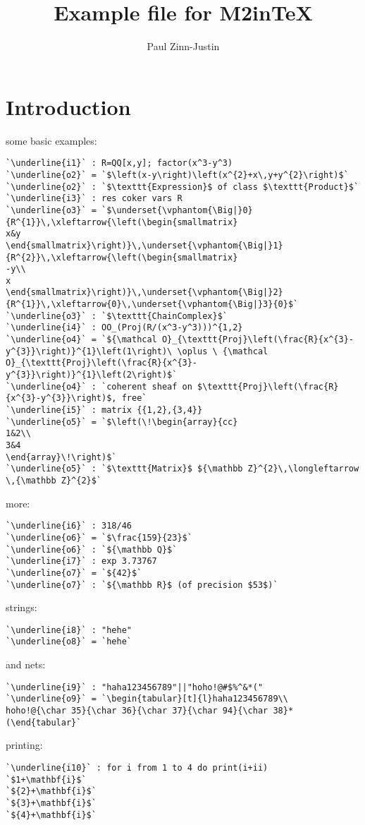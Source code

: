 \documentclass[12pt,a4paper]{amsart}
\title{Example file for M2inTeX}
\author{Paul Zinn-Justin}
\begin{document}
\maketitle

\section{Introduction}
some basic examples:
\begin{lstlisting}[language=Macaulay2]
`\underline{i1}` : R=QQ[x,y]; factor(x^3-y^3)
`\underline{o2}` = `$\left(x-y\right)\left(x^{2}+x\,y+y^{2}\right)$`
`\underline{o2}` : `$\texttt{Expression}$ of class $\texttt{Product}$`
`\underline{i3}` : res coker vars R
`\underline{o3}` = `$\underset{\vphantom{\Big|}0}{R^{1}}\,\xleftarrow{\left(\begin{smallmatrix}
x&y
\end{smallmatrix}\right)}\,\underset{\vphantom{\Big|}1}{R^{2}}\,\xleftarrow{\left(\begin{smallmatrix}
-y\\
x
\end{smallmatrix}\right)}\,\underset{\vphantom{\Big|}2}{R^{1}}\,\xleftarrow{0}\,\underset{\vphantom{\Big|}3}{0}$`
`\underline{o3}` : `$\texttt{ChainComplex}$`
`\underline{i4}` : OO_(Proj(R/(x^3-y^3)))^{1,2}
`\underline{o4}` = `${\mathcal O}_{\texttt{Proj}\left(\frac{R}{x^{3}-y^{3}}\right)}^{1}\left(1\right)\ \oplus \ {\mathcal O}_{\texttt{Proj}\left(\frac{R}{x^{3}-y^{3}}\right)}^{1}\left(2\right)$`
`\underline{o4}` : `coherent sheaf on $\texttt{Proj}\left(\frac{R}{x^{3}-y^{3}}\right)$, free`
`\underline{i5}` : matrix {{1,2},{3,4}}
`\underline{o5}` = `$\left(\!\begin{array}{cc}
1&2\\
3&4
\end{array}\!\right)$`
`\underline{o5}` : `$\texttt{Matrix}$ ${\mathbb Z}^{2}\,\longleftarrow \,{\mathbb Z}^{2}$`\end{lstlisting}
more:
\begin{lstlisting}[language=Macaulay2]
`\underline{i6}` : 318/46
`\underline{o6}` = `$\frac{159}{23}$`
`\underline{o6}` : `${\mathbb Q}$`
`\underline{i7}` : exp 3.73767
`\underline{o7}` = `${42}$`
`\underline{o7}` : `${\mathbb R}$ (of precision $53$)`\end{lstlisting}
strings:
\begin{lstlisting}[language=Macaulay2]
`\underline{i8}` : "hehe"
`\underline{o8}` = `hehe`\end{lstlisting}
and nets:
\begin{lstlisting}[language=Macaulay2]
`\underline{i9}` : "haha123456789"||"hoho!@#$%^&*("
`\underline{o9}` = `\begin{tabular}[t]{l}haha123456789\\
hoho!@{\char 35}{\char 36}{\char 37}{\char 94}{\char 38}*(\end{tabular}`\end{lstlisting}
printing:
\begin{lstlisting}[language=Macaulay2]
`\underline{i10}` : for i from 1 to 4 do print(i+ii)
`$1+\mathbf{i}$`
`${2}+\mathbf{i}$`
`${3}+\mathbf{i}$`
`${4}+\mathbf{i}$`\end{lstlisting}
\end{document}
